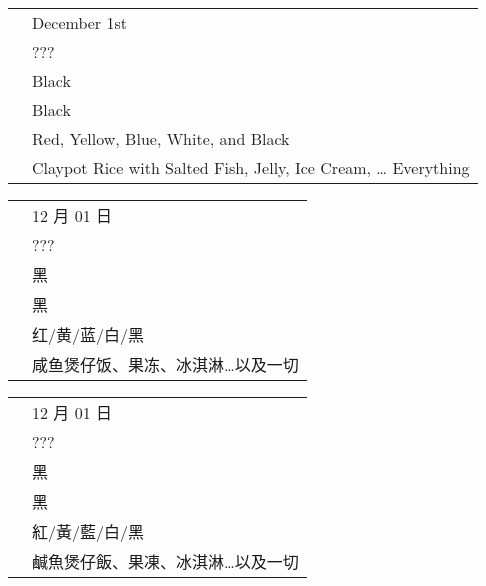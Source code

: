 \documentclass[a5paper,twosided,12pt]{book}
\begin{document}
    \begin{tabu} {XX[2]}
         & {December 1st}\\
         & {???}\\
         & {Black}\\
         & {Black}\\
         & {Red, Yellow, Blue, White, and Black}\\
         & {Claypot Rice with Salted Fish, Jelly, Ice Cream, \ldots{} Everything}\\
    \end{tabu}
    
    \begin{tabu} {XX[2]}
         & {12 月 01 日}\\
         & {???}\\
         & {黑}\\
         & {黑}\\
         & {红/黄/蓝/白/黑}\\
         & {咸鱼煲仔饭、果冻、冰淇淋\ldots{}以及一切}\\
    \end{tabu}
    
    \begin{tabu} {XX[2]}
         & {12 月 01 日}\\
         & {???}\\
         & {黑}\\
         & {黑}\\
         & {紅/黃/藍/白/黑}\\
         & {鹹魚煲仔飯、果凍、冰淇淋\ldots{}以及一切}\\
    \end{tabu}
\endgroup









\end{document}
